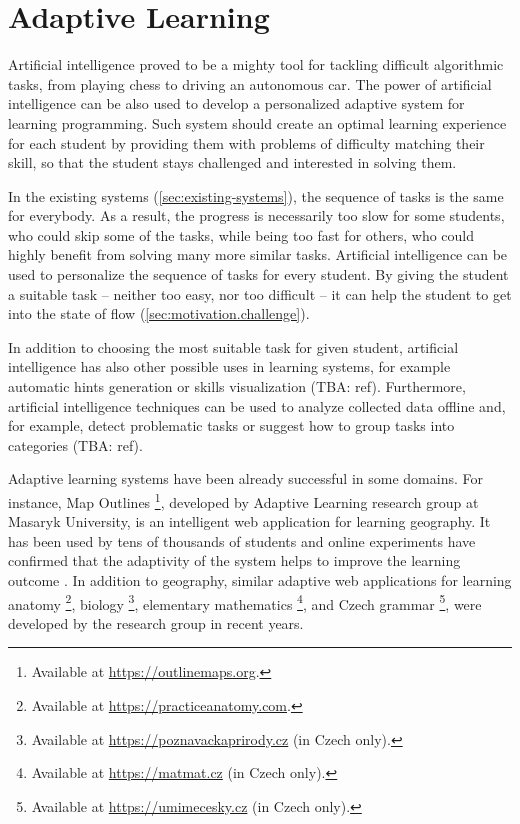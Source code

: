 \chapter{Adaptive Learning}
\label{chap:adaptive-learning}


Artificial intelligence proved to be a mighty tool
  for tackling difficult algorithmic tasks,
  from playing chess to driving an autonomous car.
The power of artificial intelligence can be also used
  to develop a personalized adaptive system for learning programming.
Such system should create an optimal learning experience for each student
  by providing them with problems of difficulty matching their skill,
  so that the student stays challenged and interested in solving them.

In the existing systems (\ref{sec:existing-systems}),
  the sequence of tasks is the same for everybody.
As a result, the progress is necessarily too slow for some students,
  who could skip some of the tasks,
  while being too fast for others,
  who could highly benefit from solving many more similar tasks.
Artificial intelligence can be used to personalize
  the sequence of tasks for every student.
By giving the student a suitable task
  -- neither too easy, nor too difficult --
  it can help the student to get into the state of flow
  (\ref{sec:motivation.challenge}).

In addition to choosing the most suitable task for given student,
  artificial intelligence has also other possible uses in learning systems,
  for example automatic hints generation \cite{generating-hints}
  or skills visualization (TBA: ref).
Furthermore, artificial intelligence techniques can be used
  to analyze collected data offline
  and, for example, detect problematic tasks
  or suggest how to group tasks into categories (TBA: ref).

Adaptive learning systems have been already successful in some domains.
For instance, Map Outlines%
  \footnote{Available at \url{https://outlinemaps.org}.},
  developed by Adaptive Learning research group at Masaryk University,
  is an intelligent web application for learning geography.
It has been used by tens of thousands of students
  and online experiments have confirmed
  that the adaptivity of the system helps to improve the learning outcome
  \cite{alg.evaluation-geography}.
In addition to geography, similar adaptive web applications
  for learning anatomy%
  \footnote{Available at \url{https://practiceanatomy.com}.},
  biology%
  \footnote{Available at \url{https://poznavackaprirody.cz} (in Czech only).},
  elementary mathematics%
  \footnote{Available at \url{https://matmat.cz} (in Czech only).},
  and Czech grammar%
  \footnote{Available at \url{https://umimecesky.cz} (in Czech only).},
  were developed by the research group in recent years.

